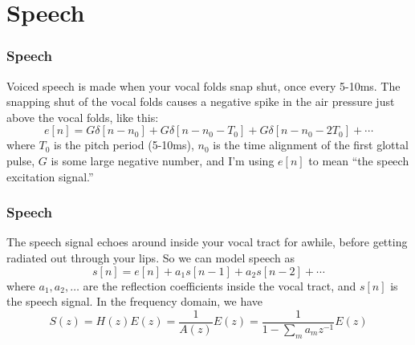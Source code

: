 \documentclass{beamer}
\begin{document}
\begin{frame}
  \centerline{}
\end{frame}

%
  
\section[Speech]{Speech}
\setcounter{subsection}{1}

\begin{frame}
  \frametitle{Speech}

  Voiced speech is made when your vocal folds snap shut, once every
  5-10ms.  The snapping shut of the vocal folds causes a negative
  spike in the air pressure just above the vocal folds, like this:
  \begin{displaymath}
    e[n] = G\delta[n-n_0]+G\delta[n-n_0-T_0]+G\delta[n-n_0-2T_0]+\cdots
  \end{displaymath}
  where $T_0$ is the pitch period (5-10ms), $n_0$ is the time
  alignment of the first glottal pulse, $G$ is some large negative
  number, and I'm using $e[n]$ to mean ``the speech excitation
  signal.''
\end{frame}

\begin{frame}
  \frametitle{Speech}

  The speech signal echoes around inside your vocal tract for awhile,
  before getting radiated out through your lips.  So we can model
  speech as
  \[
  s[n] = e[n] + a_1s[n-1] + a_2s[n-2] + \cdots
  \]
  where $a_1,a_2,\ldots$ are the reflection coefficients inside the
  vocal tract, and $s[n]$ is the speech signal.  In the frequency
  domain, we have
  \begin{displaymath}
    S(z) = H(z) E(z) = \frac{1}{A(z)} E(z) = \frac{1}{1-\sum_m a_mz^{-1}} E(z)
  \end{displaymath}
\end{frame}
\end{document}
